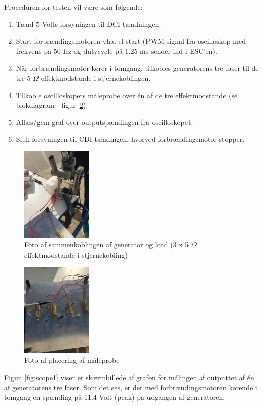 Proceduren for testen vil være som følgende:

\begin{enumerate}
\item Tænd 5 Volts forsyningen til DCI tændningen.
\item Start forbrændingsmotoren vha. el-start (PWM signal fra oscilloskop med frekvens på 50 Hz og dutycycle på 1.25 ms sender ind i ESC’en).
\item Når forbrændingsmotor kører i tomgang, tilkobles generatorens tre faser til de tre 5 $\Omega$ effektmodstande i stjernekoblingen.
\item Tilkoble oscilloskopets måleprobe over én af de tre effektmodstande (se blokdiagram - figur~\ref{fig:testsetup2}).
\item Aflæs/gem graf over outputspændingen fra oscilloskopet.
\item Sluk forsyningen til CDI tændingen, hvorved forbrændingsmotor stopper.
\end{enumerate}
\clearpage
\begin{figure}[h]
  \centering
  \includegraphics[angle=-90,width=0.3\textwidth]{testsetup2.JPG}
  \caption{Foto af sammenkoblingen af generator og load (3 x 5 $\Omega$ effektmodstande i stjernekobling)}
  \label{fig:testsetup2}
\end{figure}

\begin{figure}[h]
  \centering
  \includegraphics[angle=-90,width=0.3\textwidth]{loadstjernekobling.JPG}
  \caption{Foto af placering af måleprobe}
  \label{fig:testsetup2}
\end{figure}
\clearpage
Figur~\ref{fig:scope1} viser et skærmbillede af grafen for målingen af outputtet af én af generatorens tre faser.  
Som det ses, er der med forbrændingsmotoren kørende i tomgang en spænding på 11.4 Volt (peak) på udgangen af generatoren. 

